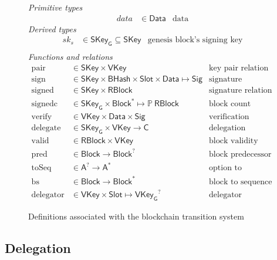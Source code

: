 \documentclass[11pt,a4paper]{article}
\newcommand{\powerset}[1]{\mathbb{P}~#1}
\newcommand{\type}[1]{\mathsf{#1}}
\newcommand{\seqof}[1]{#1^{*}}
\newcommand{\BHash}{\type{BHash}}  %
\newcommand{\Slot}{\type{Slot}}
\newcommand{\RBlock}{\type{RBlock}}
\newcommand{\Block}{\type{Block}}
\newcommand{\HCert}{\type{C}}
\newcommand{\SKey}{\type{SKey}}
\newcommand{\SKeyGen}{\type{SKey_G}}
\newcommand{\VKey}{\type{VKey}}
\newcommand{\VKeyGen}{\type{VKey_G}}
\newcommand{\Sig}{\type{Sig}}
\newcommand{\Data}{\type{Data}}
\newcommand{\signname}{sign}
\newcommand{\signedname}{signed}
\newcommand{\signedseqname}{signedc}
\newcommand{\verifyname}{verify}
\newcommand{\delegatename}{delegate}
\newcommand{\validname}{valid}
\newcommand{\keypairname}{pair}
\newcommand{\predbname}{pred} %
\newcommand{\toseqname}{toSeq} %
\newcommand{\predbseqname}{bs} %
\newcommand{\delegatorname}{delegator} %
\newcommand{\totalf}{\to}
\newcommand{\partialf}{\mapsto}
\begin{document}
\begin{figure}[h]
  \emph{Primitive types}
  \begin{align*}
  data & \in \Data    & \text{data}
  \end{align*}
  \emph{Derived types}
  \begin{align*}
    sk_s & \in \SKeyGen \subseteq \SKey & \text{genesis block's signing key}\\
  \end{align*}
  \emph{Functions and relations}
  \begin{align*}
    \text{\keypairname} & \in \SKey \times \VKey & \text{key pair relation}\\
    \text{\signname} & \in \SKey \times \BHash \times \Slot \times \Data \partialf \Sig
      & \text{signature function}\\
    \text{\signedname} & \in \SKey \times \RBlock & \text{signature relation}\\
    \text{\signedseqname} & \in \SKeyGen \times \seqof{\Block} \partialf \powerset{\RBlock}
      & \text{block count function}\\
    \text{\verifyname} & \in \VKey \times \Data \times \Sig
      & \text{verification relation}\\
    \text{\delegatename} & \in \SKeyGen \times \VKey \totalf \HCert
      & \text{delegation function}\\
    \text{\validname} & \in \RBlock \times \VKey
      & \text{block validity relation}\\
    \text{\predbname} & \in \Block \totalf \Block^?
      & \text{block predecessor function} \\
    \text{\toseqname} & \in \type{A}^? \totalf \seqof{\type{A}}
      & \text{option to sequence function} \\
    \text{\predbseqname} & \in \Block \totalf \seqof{\Block}
      & \text{block to sequence function} \\
    \text{\delegatorname} & \in \VKey \times \Slot \partialf \VKeyGen^?
      & \text{delegator function}
  \end{align*}
  \caption{Definitions associated with the blockchain transition system}
  \label{fig:state-trans-abstract}
\end{figure}

\subsection{Delegation}
\label{sec:delegation-properties}
\end{document}
